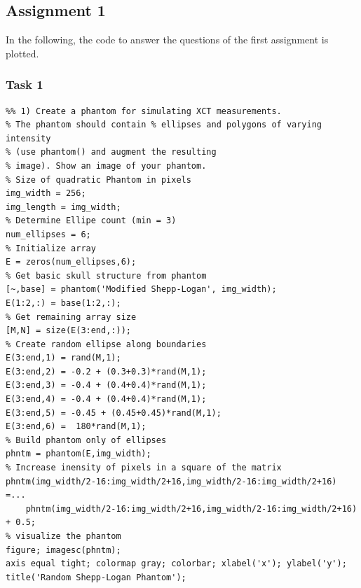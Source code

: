 \subsection*{Assignment 1}
In the following, the code to answer the questions of the first assignment is plotted.

\subsubsection*{Task 1}
\begin{lstlisting}
%% 1) Create a phantom for simulating XCT measurements.
% The phantom should contain % ellipses and polygons of varying intensity
% (use phantom() and augment the resulting
% image). Show an image of your phantom.
% Size of quadratic Phantom in pixels
img_width = 256;
img_length = img_width;
% Determine Ellipe count (min = 3)
num_ellipses = 6;
% Initialize array
E = zeros(num_ellipses,6);
% Get basic skull structure from phantom
[~,base] = phantom('Modified Shepp-Logan', img_width);
E(1:2,:) = base(1:2,:);
% Get remaining array size
[M,N] = size(E(3:end,:));
% Create random ellipse along boundaries
E(3:end,1) = rand(M,1);
E(3:end,2) = -0.2 + (0.3+0.3)*rand(M,1);
E(3:end,3) = -0.4 + (0.4+0.4)*rand(M,1);
E(3:end,4) = -0.4 + (0.4+0.4)*rand(M,1);
E(3:end,5) = -0.45 + (0.45+0.45)*rand(M,1);
E(3:end,6) =  180*rand(M,1);
% Build phantom only of ellipses
phntm = phantom(E,img_width);
% Increase inensity of pixels in a square of the matrix
phntm(img_width/2-16:img_width/2+16,img_width/2-16:img_width/2+16) =...
    phntm(img_width/2-16:img_width/2+16,img_width/2-16:img_width/2+16) + 0.5;
% visualize the phantom
figure; imagesc(phntm);
axis equal tight; colormap gray; colorbar; xlabel('x'); ylabel('y');
title('Random Shepp-Logan Phantom');
\end{lstlisting}
\newpage


